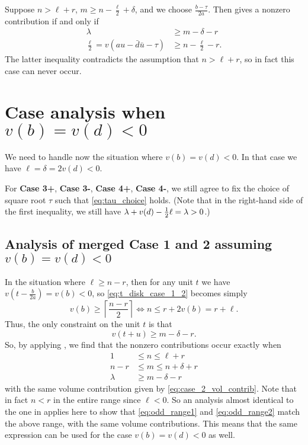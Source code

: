 \begin{description}
Suppose $n > \ell + r$,
$m \ge n - \frac{\ell}{2} + \delta$, and we choose $\frac{b-\tau}{2a}$.
Then  gives a nonzero contribution if and only if
\begin{align*}
  \lambda &\geq m - \delta - r \\
  \frac{\ell}{2} = v(au-\bar d \bar u - \tau) & \geq n - \frac{\ell}{2} - r.
\end{align*}
The latter inequality contradicts the assumption that $n > \ell + r$,
so in fact this case can never occur.
\end{description}

\section{Case analysis when $v(b) = v(d) < 0$}
We need to handle now the situation where $v(b) = v(d) < 0$.
In that case we have $\ell = \delta = 2v(d) < 0$.

For \textbf{Case 3\ts+}, \textbf{Case 3\ts-}, \textbf{Case 4\ts+}, \textbf{Case 4\ts-},
we still agree to fix the choice of square root $\tau$ such that
\eqref{eq:tau_choice} holds.
(Note that in the right-hand side of the first inequality,
we still have $\lambda + v(d) - \frac{1}{2} \ell = \lambda > 0$.)

\subsection{Analysis of merged Case 1 and 2 assuming $v(b) = v(d) < 0$}
In the situation where $\ell \ge n - r$,
then for any unit $t$ we have $v(t-\frac{b}{2a}) = v(b) < 0$,
so \eqref{eq:t_disk_case_1_2} becomes simply
\[ v(b) \ge \left\lceil \frac{n-r}{2} \right\rceil \iff n \le r + 2 v(b) = r + \ell. \]
Thus, the only constraint on the unit $t$ is that
\[ v(t + u) \ge m - \delta - r. \]
So, by applying , we find that the nonzero contributions occur exactly when
\begin{align*}
  1 &\le n \le \ell + r \\
  n-r &\le m \le n + \delta + r \\
  \lambda &\ge m - \delta - r
\end{align*}
with the same volume contribution given by \eqref{eq:case_2_vol_contrib}.
Note that in fact $n < r$ in the entire range since $\ell < 0$.
So an analysis almost identical to the one in  applies here
to show that \eqref{eq:odd_range1} and \eqref{eq:odd_range2}
match the above range, with the same volume contributions.
This means that the same expression can be used for the case $v(b) = v(d) < 0$ as well.

